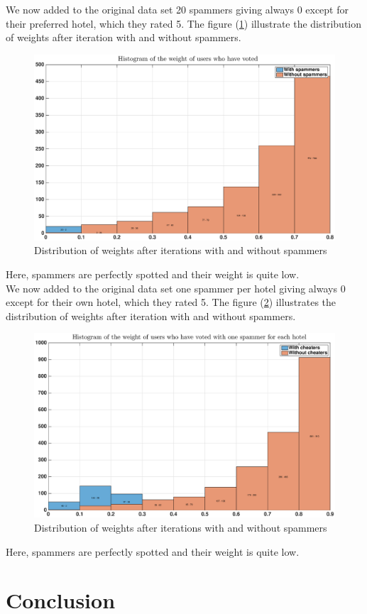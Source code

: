 \documentclass[12pt,a4paper]{article}
\begin{document}
We now added to the original data set 20 spammers giving always 0 except for their preferred hotel, which they rated 5. The figure (\ref{fig:hotel:not_random_cheaters}) illustrate the distribution of weights after iteration with and without spammers.

\begin{figure}[!h]
\centering
\includegraphics[width = \textwidth]{hotels/not_random_cheaters.eps}
\caption{\label{fig:hotel:not_random_cheaters} Distribution of weights after iterations with and without spammers}
\end{figure}

Here, spammers are perfectly spotted and their weight is quite low.\\

We now added to the original data set one spammer per hotel giving always 0 except for their own hotel, which they rated 5. The figure (\ref{fig:hotel:not_random_each_hotel}) illustrates the distribution of weights after iteration with and without spammers.

\begin{figure}[!h]
\centering
\includegraphics[width = \textwidth]{hotels/not_random_each_hotels.eps}
\caption{\label{fig:hotel:not_random_each_hotel} Distribution of weights after iterations with and without spammers}
\end{figure}

Here, spammers are perfectly spotted and their weight is quite low.

\FloatBarrier
\section{Conclusion}



\nocite{*}
\end{document}
